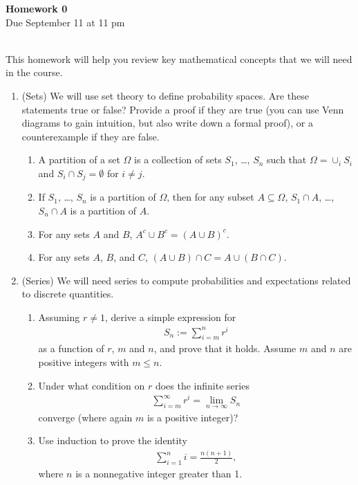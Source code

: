 \documentclass[12pt,twoside]{article}
\begin{document}
\begin{center}
{\large{\textbf{Homework 0}} } \vspace{0.2cm}\\
Due September 11 at 11 pm
\\
\end{center}
\\

This homework will help you review key mathematical concepts that we
will need in the course.
\begin{enumerate}

\item (Sets) We will use set theory to define probability spaces. Are these statements true or false? Provide a proof if they are true (you can use Venn diagrams to gain intuition, but also write down a formal proof), or a counterexample if they are false. 
\begin{enumerate}
\item[] A partition of a set $\Omega$ is a collection of sets $S_1$, \ldots, $S_n$ such that $\Omega = \cup_{i}S_i$ and $S_i \cap S_j = \emptyset$ for $i\neq j$. 
\item If  $S_1$, \ldots, $S_n$ is a partition of $\Omega$, then for any subset $A \subseteq \Omega$, $S_1 \cap A$, \ldots, $S_n \cap A$ is a partition of $A$.
\item For any sets $A$ and $B$, $A^c \cup B^c = (A \cup B)^c$. 
\item For any sets $A$, $B$, and $C$, $(A \cup B) \cap C = A \cup (B \cap C)$. 
\end{enumerate}

\item (Series) We will need series to compute probabilities and expectations related to discrete quantities. 
 \begin{enumerate}
\item  Assuming $r\neq 1$, derive a simple expression for
\begin{align}
S_n := \sum_{i=m}^{n} r^{i}
\end{align}
as a function of $r$, $m$ and $n$, and prove that it holds. Assume $m$
and $n$ are positive integers with $m\leq n$.
\item Under what condition on $r$ does the infinite series
\begin{align}
\sum_{i=m}^{\infty} r^{i} = \lim_{n \rightarrow \infty} S_n
\end{align}
converge (where again $m$ is a positive integer)?  
\item Use induction to prove the identity
\begin{align}
\sum_{i=1}^{n} i = \frac{n(n+1)}{2},
\end{align}
where $n$ is a nonnegative integer greater than 1.
\end{enumerate}



\end{enumerate}
\end{document}
